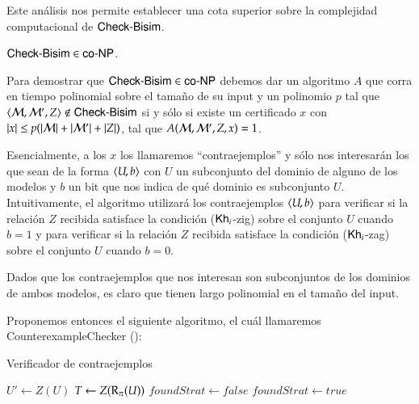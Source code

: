 Este análisis nos permite establecer una cota superior sobre la complejidad computacional de $\rm\textsf{Check-Bisim}$.

\begin{lema}\label{lema:cbisim-in-conp}
    $\rm\textsf{Check-Bisim} \in \rm\textsf{co-NP}$. 
\end{lema}

\begin{demostracion}
    Para demostrar que $\rm\textsf{Check-Bisim} \in \rm\textsf{co-NP}$ debemos dar un algoritmo $A$ que corra en tiempo polinomial sobre el tamaño de su input 
    y un polinomio $p$ tal que $\langle \mathcal{M},\mathcal{M}',Z \rangle \not\in \rm\textsf{Check-Bisim}$ si y sólo si existe un 
    certificado $x$ con $|x| \le p(|\mathcal{M}|+|\mathcal{M}'|+|Z|)$, tal que $A(\mathcal{M},\mathcal{M}',Z,x) = 1$. 
    
    Esencialmente, a los $x$ los llamaremos ``contraejemplos'' y sólo nos interesarán los que sean de la forma $\langle U,b \rangle$ con $U$ un 
    subconjunto del dominio de alguno de los modelos y $b$ un bit que nos indica de qué dominio es subconjunto $U$. 
    Intuitivamente, el algoritmo utilizará los contraejemplos $\langle U,b \rangle$ para verificar si la relación $Z$ recibida 
    satisface la condición ($\mathsf{Kh}_i$-zig) sobre el conjunto $U$ cuando $b = 1$ y para verificar si la 
    relación $Z$ recibida satisface la condición ($\mathsf{Kh}_i$-zag) sobre el conjunto $U$ cuando $b = 0$.

    Dados que los contraejemplos que nos interesan son subconjuntos de los dominios de ambos modelos, es claro 
    que tienen largo polinomial en el tamaño del input.

    Proponemos entonces el siguiente algoritmo, el cuál llamaremos \textsf{CounterexampleChecker} ():

    \begin{algorithm}
        \caption{Verificador de contraejemplos}
        \label{alg:counter-example-checker}
        \begin{algorithmic}[1]
                        \State $U' \gets Z(U)$
                        \State $T \gets Z(\mathrm{R}_\pi(U))$ 
                        \State $foundStrat \gets false$
                                    \State $foundStrat \gets true$
                                \EndIf         
                            \EndFor
                            \EndIf
                        \EndIf
                    \EndFor
                \EndFor
                \State {}
            \EndFunction


\end{algorithmic}
\end{algorithm}
\end{demostracion}
